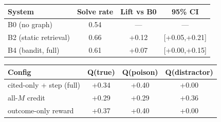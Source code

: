 \begin{tabular}{lccc}\toprule
System & Solve rate & Lift vs B0 & 95\% CI \\\midrule
B0 (no graph) & 0.54 & --- & --- \\
B2 (static retrieval) & 0.66 & +0.12 & [+0.05,+0.21] \\
B4 (bandit, full) & 0.61 & +0.07 & [+0.00,+0.15] \\
\bottomrule\end{tabular}

\begin{tabular}{lccc}\toprule
Config & Q(true) & Q(poison) & Q(distractor) \\\midrule
cited-only + step (full) & +0.34 & +0.40 & +0.00 \\
all-$M$ credit & +0.29 & +0.29 & +0.36 \\
outcome-only reward & +0.37 & +0.40 & +0.00 \\
\bottomrule\end{tabular}